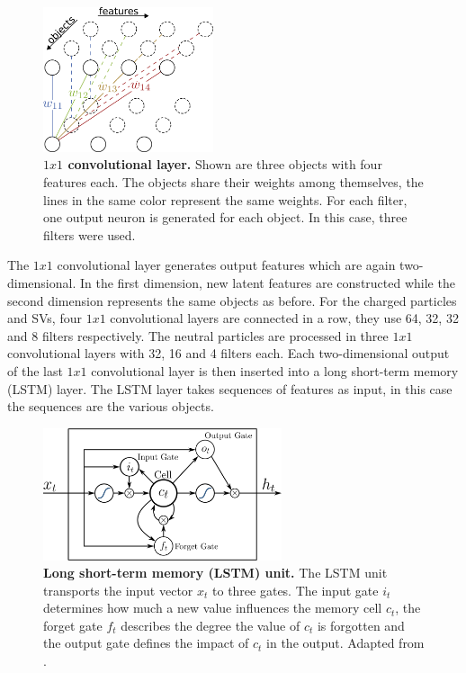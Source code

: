 \begin{figure}
\centering
\includegraphics[width=5cm]{assets/convolutional.png}
\caption[$1x1$ Convolutional Layer and LSTM Unit]{\textbf{$1x1$ convolutional layer.} Shown are three objects with four features each. The objects share their weights among themselves, the lines in the same color represent the same weights. For each filter, one output neuron is generated for each object. In this case, three filters were used.}
\label{fig:ch_5_Conv}
\end{figure}

The $1x1$ convolutional layer generates output features which are again two-dimensional. In the first dimension, new latent features are constructed while the second dimension represents the same objects as before. For the charged particles and SVs, four $1x1$ convolutional layers are connected in a row, they use 64, 32, 32 and 8 filters respectively. The neutral particles are processed in three $1x1$ convolutional layers with 32, 16 and 4 filters each. Each two-dimensional output of the last $1x1$ convolutional layer is then inserted into a long short-term memory (LSTM) \cite{LSTM} layer. The LSTM layer takes sequences of features as input, in this case the sequences are the various objects.\\

\begin{figure}
\centering
\includegraphics[width=7cm]{assets/lstm.png}
\caption[Long Short-Term Memory Unit]{\textbf{Long short-term memory (LSTM) unit.} The LSTM unit transports the input vector $x_t$ to three gates. The input gate $i_t$ determines how much a new value influences the memory cell $c_t$, the forget gate $f_t$ describes the degree the value of $c_t$ is forgotten and the output gate defines the impact of $c_t$ in the output. Adapted from \cite{LSTMunit}.}
\label{fig:ch_5_LSTM}
\end{figure}

